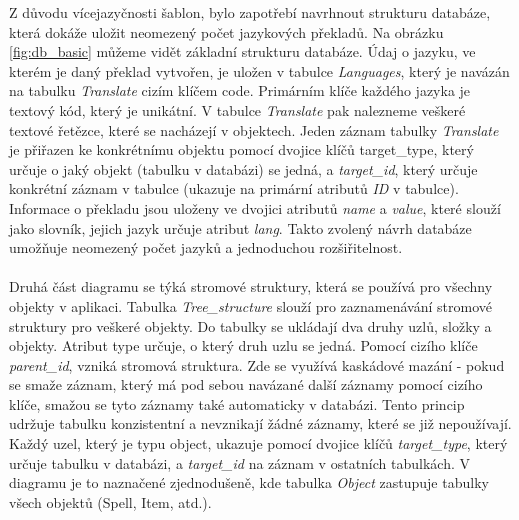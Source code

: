 \documentclass[thesis=B,czech]{resources/FITthesis}[2012/06/26]
\begin{document}
Z důvodu vícejazyčnosti šablon, bylo zapotřebí navrhnout strukturu databáze, která dokáže uložit neomezený počet jazykových překladů. Na obrázku \ref{fig:db_basic} můžeme vidět základní strukturu databáze. Údaj o jazyku, ve kterém je daný překlad vytvořen, je uložen v tabulce \textit{Languages}, který je navázán na tabulku \textit{Translate} cizím klíčem code. Primárním klíče každého jazyka je textový kód, který je unikátní. V tabulce \textit{Translate} pak nalezneme veškeré textové řetězce, které se nacházejí v objektech. Jeden záznam tabulky \textit{Translate} je přiřazen ke konkrétnímu objektu pomocí dvojice klíčů target\_type, který určuje o jaký objekt (tabulku v databázi) se jedná, a \textit{target\_id}, který určuje konkrétní záznam v tabulce (ukazuje na primární atributů \textit{ID} v tabulce). Informace o překladu jsou uloženy ve dvojici atributů \textit{name} a \textit{value}, které slouží jako slovník, jejich jazyk určuje atribut \textit{lang}. Takto zvolený návrh databáze umožňuje neomezený počet jazyků a jednoduchou rozšiřitelnost.\\
\\
Druhá část diagramu se týká stromové struktury, která se používá pro všechny objekty v aplikaci. Tabulka \textit{Tree\_structure} slouží pro zaznamenávání stromové struktury pro veškeré objekty. Do tabulky se ukládají dva druhy uzlů, složky a objekty. Atribut type určuje, o který druh uzlu se jedná. Pomocí cizího klíče \textit{parent\_id}, vzniká stromová struktura. Zde se využívá kaskádové mazání - pokud se smaže záznam, který má pod sebou navázané další záznamy pomocí cizího klíče, smažou se tyto záznamy také automaticky v databázi. Tento princip udržuje tabulku konzistentní a nevznikají žádné záznamy, které se již nepoužívají. Každý uzel, který je typu object, ukazuje pomocí dvojice klíčů \textit{target\_type}, který určuje tabulku v databázi, a \textit{target\_id} na záznam v ostatních tabulkách. V diagramu je to naznačené zjednodušeně, kde tabulka \textit{Object} zastupuje tabulky všech objektů (Spell, Item, atd.). \\
\\
\end{document}

